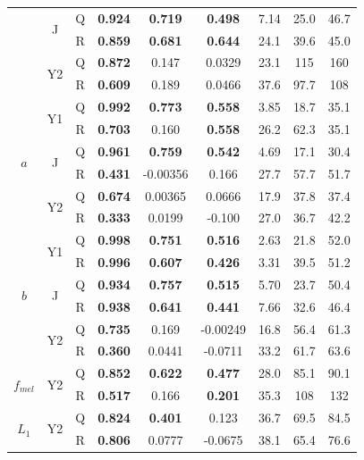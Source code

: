 \begin{table}[h!]
\begin{tabular}{|ccc|ccc|ccc|}
        \cline{2-9}
        & \multirow{2}{*}{J} & Q & \textbf{0.924} & \textbf{0.719} & \textbf{0.498} & 7.14 & 25.0 & 46.7 \\
        & & R & \textbf{0.859} & \textbf{0.681} & \textbf{0.644} & 24.1 & 39.6 & 45.0 \\
        \cline{2-9}
        & \multirow{2}{*}{Y2} & Q & \textbf{0.872} & 0.147 & 0.0329 & 23.1 & 115 & 160 \\
        & & R & \textbf{0.609} & 0.189 & 0.0466 & 37.6 & 97.7 & 108 \\
        \hline
        \multirow{6}{*}{$a$} & \multirow{2}{*}{Y1} & Q & \textbf{0.992} & \textbf{0.773} & \textbf{0.558} & 3.85 & 18.7 & 35.1 \\
        & & R & \textbf{0.703} & 0.160 & \textbf{0.558} & 26.2 & 62.3 & 35.1 \\
        \cline{2-9}
        & \multirow{2}{*}{J} & Q & \textbf{0.961} & \textbf{0.759} & \textbf{0.542} & 4.69 & 17.1 & 30.4 \\
        & & R & \textbf{0.431} & -0.00356 & 0.166 & 27.7 & 57.7 & 51.7 \\
        \cline{2-9}
        & \multirow{2}{*}{Y2} & Q & \textbf{0.674} & 0.00365 & 0.0666 & 17.9 & 37.8 & 37.4 \\
        & & R & \textbf{0.333} & 0.0199 & -0.100 & 27.0 & 36.7 & 42.2 \\
        \hline
        \multirow{6}{*}{$b$} & \multirow{2}{*}{Y1} & Q & \textbf{0.998} & \textbf{0.751} & \textbf{0.516} & 2.63 & 21.8 & 52.0 \\
        & & R & \textbf{0.996} & \textbf{0.607} & \textbf{0.426} & 3.31 & 39.5 & 51.2 \\
        \cline{2-9}
        & \multirow{2}{*}{J} & Q & \textbf{0.934} & \textbf{0.757} & \textbf{0.515} & 5.70 & 23.7 & 50.4 \\
        & & R & \textbf{0.938} & \textbf{0.641} & \textbf{0.441} & 7.66 & 32.6 & 46.4 \\
        \cline{2-9}
        & \multirow{2}{*}{Y2} & Q & \textbf{0.735} & 0.169 & -0.00249 & 16.8 & 56.4 & 61.3 \\
        & & R & \textbf{0.360} & 0.0441 & -0.0711 & 33.2 & 61.7 & 63.6 \\
        \hline
        \multirow{2}{*}{$f_{mel}$} & \multirow{2}{*}{Y2} & Q & \textbf{0.852} & \textbf{0.622} & \textbf{0.477} & 28.0 & 85.1 & 90.1 \\ 
        & & R & \textbf{0.517} & 0.166 & \textbf{0.201} & 35.3 & 108 & 132 \\
        \hline
        \multirow{2}{*}{$L_1$} & \multirow{2}{*}{Y2} & Q & \textbf{0.824} & \textbf{0.401} & 0.123 & 36.7 & 69.5 & 84.5 \\
        & & R & \textbf{0.806} & 0.0777 & -0.0675 & 38.1 & 65.4 & 76.6 \\
        \hline
    \end{tabular}    
    \label{tb:backwardsHSIMC}
\end{table}

